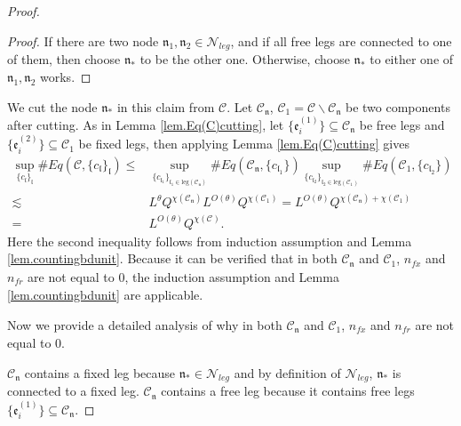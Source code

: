 \begin{proof}
\begin{proof}
If there are two node $\mathfrak{n}_1, \mathfrak{n}_2\in \mathcal{N}_{leg}$, and if all free legs are connected to one of them, then choose $\mathfrak{n}_*$ to be the other one. Otherwise, choose $\mathfrak{n}_*$ to either one of $\mathfrak{n}_1, \mathfrak{n}_2$ works.
\end{proof}

We cut the node $\mathfrak{n}_*$ in this claim from $\mathcal{C}$. Let $\mathcal{C}_{\mathfrak{n}}$, $\mathcal{C}_1=\mathcal{C}\backslash \mathcal{C}_{\mathfrak{n}}$ be two components after cutting. As in Lemma \ref{lem.Eq(C)cutting}, let  $\{\mathfrak{e}_{i}^{(1)}\}\subseteq \mathcal{C}_{\mathfrak{n}}$ be free legs and $\{\mathfrak{e}_{i}^{(2)}\}\subseteq \mathcal{C}_1$ be fixed legs, then applying Lemma \ref{lem.Eq(C)cutting} gives
\begin{equation}
\begin{split}
    \sup_{\{c_{\mathfrak{l}}\}_{\mathfrak{l}}}\#Eq(\mathcal{C},\{c_{\mathfrak{l}}\}_{\mathfrak{l}})\le&
    \sup_{\{c_{\mathfrak{l}_1}\}_{\mathfrak{l}_1\in \text{leg}(\mathcal{C}_{\mathfrak{n}})} } \# Eq(\mathcal{C}_{\mathfrak{n}},\{c_{\mathfrak{l}_1}\}) \sup_{\{c_{\mathfrak{l}_2}\}_{\mathfrak{l}_2\in \text{leg}(\mathcal{C}_1)} }\# Eq(\mathcal{C}_1, \{c_{\mathfrak{l}_2}\})
    \\
    \lesssim&  L^{\theta} Q^{\chi(\mathcal{C}_{\mathfrak{n}})} L^{O(\theta)} Q^{\chi(\mathcal{C}_1)} = L^{O(\theta)} Q^{\chi(\mathcal{C}_{\mathfrak{n}})+\chi(\mathcal{C}_1)} \\
    =& L^{O(\theta)} Q^{\chi(\mathcal{C})}.
\end{split}
\end{equation}
Here the second inequality follows from induction assumption and Lemma \ref{lem.countingbdunit}. Because it can be verified that in both $\mathcal{C}_{\mathfrak{n}}$ and $\mathcal{C}_1$, $n_{\textit{fx}}$ and $n_{\textit{fr}}$ are not equal to $0$, the induction assumption and Lemma \ref{lem.countingbdunit} are applicable.

Now we provide a detailed analysis of why in both $\mathcal{C}_{\mathfrak{n}}$ and $\mathcal{C}_1$, $n_{\textit{fx}}$ and $n_{\textit{fr}}$ are not equal to $0$. 

$\mathcal{C}_{\mathfrak{n}}$ contains a fixed leg because $\mathfrak{n}_*\in \mathcal{N}_{leg}$ and by definition of $\mathcal{N}_{leg}$, $\mathfrak{n}_*$ is connected to a fixed leg. $\mathcal{C}_{\mathfrak{n}}$ contains a free leg because it contains free legs $\{\mathfrak{e}_{i}^{(1)}\}\subseteq \mathcal{C}_{\mathfrak{n}}$.


\end{proof}

